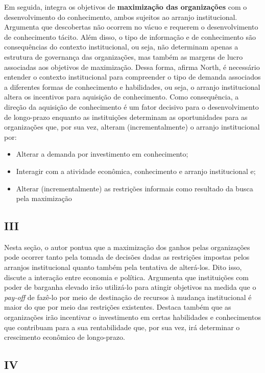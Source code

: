Em seguida, \autor integra os objetivos de \textbf{maximização das organizações} com o desenvolvimento do conhecimento, ambos sujeitos ao arranjo institucional. Argumenta que descobertas não ocorrem no vácuo e requerem o desenvolvimento de conhecimento tácito. Além disso, o tipo de informação e de conhecimento são consequências do contexto institucional, ou seja, não determinam apenas a estrutura de governança das organizações, mas também as margens de lucro associadas aos objetivos de maximização. Dessa forma, afirma North, é necessário entender o contexto institucional para compreender o tipo de demanda associados a diferentes formas de conhecimento e habilidades, ou seja, o arranjo institucional altera os incentivos para aquisição de conhecimento. Como consequência, a direção da aquisição de conhecimento é um fator decisivo para o desenvolvimento de longo-prazo enquanto as instituições determinam as oportunidades para as organizações que, por sua vez, alteram (incrementalmente) o arranjo institucional por:
\begin{itemize}
	\item Alterar a demanda por investimento em conhecimento;
	\item Interagir com a atividade econômica, conhecimento e arranjo institucional e;
	\item Alterar (incrementalmente) as restrições informais como resultado da busca pela maximização
\end{itemize}

\subsection*{III}

Nesta seção, o autor pontua que a maximização dos ganhos pelas organizações pode ocorrer tanto pela tomada de decisões dadas as restrições impostas pelos arranjos institucional quanto também pela tentativa de alterá-los. Dito isso, discute a interação entre economia e política. Argumenta que instituições com poder de barganha elevado irão utilizá-lo para atingir objetivos na medida que o \textit{pay-off} de fazê-lo por meio de destinação de recursos à mudança institucional é maior do que por meio das restrições existentes. Destaca também que as organizações irão incentivar o investimento em certas habilidades e conhecimentos que contribuam para a sua rentabilidade que, por sua vez, irá determinar o crescimento econômico de longo-prazo.


\subsection*{IV}

